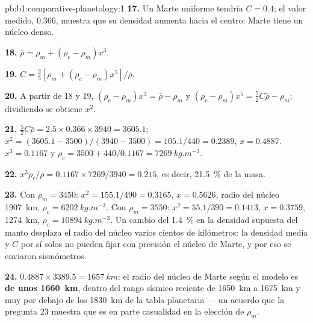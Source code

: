 \begin{solution}{pb:b1:comparative-planetology:1}
\textbf{17.} Un Marte uniforme tendría $C = 0.4$; el valor medido, 0.366, muestra que su
densidad aumenta hacia el centro: Marte tiene un núcleo denso.

\textbf{18.} $\bar\rho = \rho_m + (\rho_c - \rho_m)x^3$.

\textbf{19.} $C = \tfrac25[\rho_m + (\rho_c - \rho_m)x^5]/\bar\rho$.

\textbf{20.} A partir de 18 y 19, $(\rho_c - \rho_m)x^3 = \bar\rho - \rho_m$ y
$(\rho_c - \rho_m)x^5 = \tfrac52C\bar\rho - \rho_m$; dividiendo se obtiene $x^2$.

\textbf{21.} $\tfrac52C\bar\rho = 2.5\times0.366\times3940 = 3605.1$;
$x^2 = (3605.1 - 3500)/(3940 - 3500) = 105.1/440 = 0.2389$, $x = 0.4887$.
$x^3 = 0.1167$ y $\rho_c = 3500 + 440/0.1167 = \qty{7269}{kg.m^{-3}}$.

\textbf{22.} $x^3\rho_c/\bar\rho = 0.1167\times7269/3940 = 0.215$, es decir, \qty{21.5}{\percent}
de la masa.

\textbf{23.} Con $\rho_m = 3450$: $x^2 = 155.1/490 = 0.3165$, $x = 0.5626$, radio del núcleo
\qty{1907}{km}, $\rho_c = \qty{6202}{kg.m^{-3}}$. Con $\rho_m =
3550$: $x^2 = 55.1/390 = 0.1413$, $x = 0.3759$, \qty{1274}{km},
$\rho_c = \qty{10894}{kg.m^{-3}}$. Un cambio del \qty{1.4}{\percent} en la densidad supuesta del
manto desplaza el radio del núcleo varios cientos de kilómetros: la densidad media y $C$ por sí
solos no pueden fijar con precisión el núcleo de Marte, y por eso se enviaron sismómetros.

\textbf{24.} $0.4887\times3389.5 = \qty{1657}{km}$: el radio del núcleo de Marte según el modelo
es \textbf{de unos \qty[text-series-to-math=true]{1660}{km}}, dentro del rango sísmico reciente
de \qty{1650}{km} a \qty{1675}{km} y muy por debajo de los \qty{1830}{km} de la tabla planetaria
--- un acuerdo que la pregunta 23 muestra que es en parte casualidad en la elección de $\rho_m$.
\end{solution}
